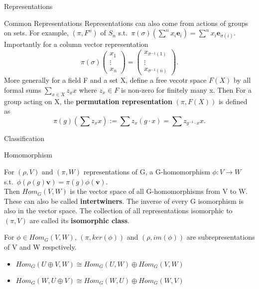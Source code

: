 \documentclass[12pt, letterpaper]{article}
\begin{document}
\begin{section}{Representations}
\begin{subsection}{Common Representations}
      Representations can also come from actions of groups on sets. For example,
      \((\pi, F^{n})\) of \(S_{n}\) s.t.\ \(\pi(\sigma)
      (\sum^{n} x_{i} \textbf{e}_{i}) = \sum^{n} x_{i} \textbf{e}_{\sigma(i)}\).
      Importantly for a column vector representation \[\pi(\sigma)
        \begin{pmatrix} x_{1} \\ \vdots \\ x_{n} \end{pmatrix} =
        \begin{pmatrix} x_{\sigma^{-1}(1)} \\ \vdots \\ x_{\sigma^{-1}(n)}
        \end{pmatrix}.
      \]
      More generally for a field F and a set X, define a free vecotr space
      \(F(X)\) by all formal sums \(\sum_{x \in X} z_{x} x\) where
      \(z_{x} \in F\) is non-zero for finitely many x. Then For a group acting
      on X, the \textbf{permutation representation} \((\pi, F(X))\) is defined
      as \[\pi(g)(\sum z_{x} x) := \sum z_{x} (g \cdot x) =
        \sum z_{g^{-1} \cdot x} x.\]

  \end{subsection}

  \begin{subsection}{Classification}

    \begin{subsubsection}{Homomorphism}

      For \((\rho, V)\) and \((\pi, W)\) representations of G, a G-homomorphism
      \(\phi: V \to W\) s.t.\
      \(\phi(\rho(g) \textbf{v}) = \pi(g) \phi(\textbf{v})\). \\
      Then \(Hom_{G}(V, W)\) is the vector space of all G-homomorphisms from V
      to W. These can also be called \textbf{intertwiners}. The inverse of every
      G isomorphism is also in the vector space. The collection of all
      representations isomorphic to \((\pi, V)\) are called its
      \textbf{isomorphic class}.

      For \(\phi \in Hom_{G}(V, W)\), \((\pi, ker(\phi))\) and
      \((\rho, im(\phi))\) are subrepresentations of V and W respctively.

      \begin{itemize}
        \item \(Hom_{G}(U \oplus V, W) \cong
              Hom_{G}(U, W) \oplus Hom_{G}(V, W)\)
        \item \(Hom_{G}(W, U \oplus V) \cong
              Hom_{G}(W, U) \oplus Hom_{G}(W, V)\)
      \end{itemize}


\end{subsubsection}
\end{subsection}
\end{section}
\end{document}
